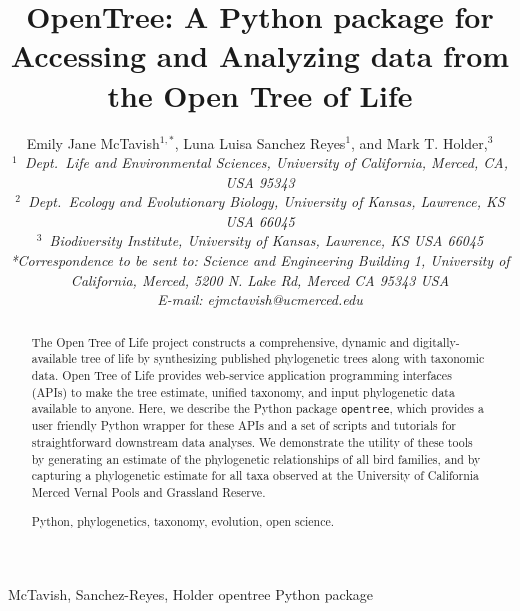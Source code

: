 \documentclass[oupdraft]{sysbio_sse}
\begin{document}
\title{OpenTree: A Python package for Accessing and Analyzing data from the Open Tree of Life}

\author{Emily Jane McTavish$^{1,\ast}$, Luna Luisa Sanchez Reyes$^{1}$, and
Mark T. Holder,$^{3}$\\[4pt]
\textit{$^{1}$~Dept.~Life and Environmental Sciences, University of California, Merced, CA, USA 95343}
\\
\textit{$^{2}$~Dept.~Ecology and Evolutionary Biology, University of Kansas, Lawrence, KS USA 66045}\\
\textit{$^{3}$~Biodiversity Institute, University of Kansas, Lawrence, KS USA 66045}
\\[2pt]
\textit{*Correspondence to be sent to: Science and Engineering Building 1, University of California, Merced, 5200 N.
Lake Rd, Merced CA 95343 USA\\
E-mail: ejmctavish@ucmerced.edu
}}

\markboth%
{McTavish, Sanchez-Reyes, Holder}
{opentree Python package}

\maketitle

\begin{abstract}
{The Open Tree of Life project constructs a comprehensive, dynamic and digitally-available tree of life by synthesizing published phylogenetic trees along with taxonomic data.
Open Tree of Life provides web-service application programming interfaces (APIs) to make the tree estimate, unified taxonomy, and input phylogenetic data available to anyone.
Here, we describe the Python package \texttt{opentree}, which provides a user friendly Python wrapper for these APIs and a set of scripts and tutorials for straightforward downstream data analyses.
We demonstrate the utility of these tools by generating an estimate of the phylogenetic relationships of all bird families, and by capturing a phylogenetic estimate for all taxa  observed at the University of California Merced Vernal Pools and Grassland Reserve.
}

{Python, phylogenetics, taxonomy, evolution, open science.}
\end{abstract}
\newline
\end{document}
